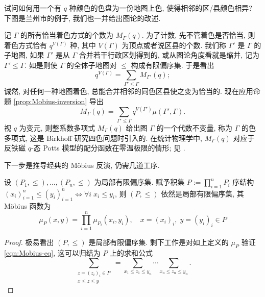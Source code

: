 \begin{example}[色多项式]
	试问如何用一个有 $q$ 种颜色的色盘为一份地图上色, 使得相邻的区/县颜色相异? 下图是兰州市的例子, 我们也一并给出图论的改述.
	\begin{center}\end{center}

	记 $\Gamma$ 的所有恰当着色方式的个数为 $M_\Gamma(q)$. 为了计数, 先不管着色是否恰当, 则着色方式恰有 $q^{V(\Gamma)}$ 种, 其中 $V(\Gamma)$ 为顶点或者说区县的个数. 我们称 $\Gamma'$ 是 $\Gamma$ 的子地图, 如果 $\Gamma'$ 是从 $\Gamma$ 合并若干行政区划得到的, 或从图论角度看就是缩并, 记为 $\Gamma' \leq \Gamma$. 如是则使 $\Gamma$ 的全体子地图对 $\leq$ 构成有限偏序集. 于是看出
	\[ q^{V(\Gamma)} = \sum_{\Gamma' \leq \Gamma} M_{\Gamma'}(q); \]
	诚然, 对任何一种地图着色, 总能合并相邻的同色区县使之变为恰当的. 现在应用命题 \ref{prop:Mobius-inversion} 导出
	\[ M_\Gamma(q) = \sum_{\Gamma' \leq \Gamma} q^{V(\Gamma')} \mu(\Gamma', \Gamma).  \]
	视 $q$ 为变元, 则整系数多项式 $M_\Gamma(q)$ 给出图 $\Gamma$ 的一个代数不变量, 称为 $\Gamma$ 的色多项式, 这是 Birkhoff 研究四色问题时引入的. 在统计物理学中, $M_\Gamma(q)$ 对应于反铁磁 $q$-态 Potts 模型的配分函数在零温极限的情形; 见 \cite{Sok05}.
\end{example}

下一步是推导经典的 Möbius 反演, 仍需几道工序.
\begin{lemma}\label{prop:Mobius-prod}
	设 $(P_1, \leq), \ldots, (P_n, \leq)$ 为局部有限偏序集. 赋予积集 $P := \prod_{i=1}^n P_i$ 序结构 $(x_i)_{i=1}^n \leq (y_i)_{i=1}^n \iff \forall i\; x_i \leq y_i$, 则 $(P, \leq)$ 依然是局部有限偏序集, 其 Möbius 函数为
	\[ \mu_P\left( x, y \right) = \prod_{i=1}^n \mu_{P_i}(x_i, y_i), \quad x=(x_i)_i, \; y=(y_i)_i \in P \]
\end{lemma}
\begin{proof}
	极易看出 $(P, \leq)$ 是局部有限偏序集. 剩下工作是对如上定义的 $\mu_P$ 验证 \eqref{eqn:Mobius-eq}, 这可以归结为 $P$ 上的求和公式
	\begin{equation*}
		\sum_{\substack{z = (z_i)_i \in P \\ x \leq z \leq y}} = \sum_{x_1 \leq z_1 \leq y_n} \cdots \sum_{x_n \leq z_n \leq y_n}.
	\end{equation*}
\end{proof}

